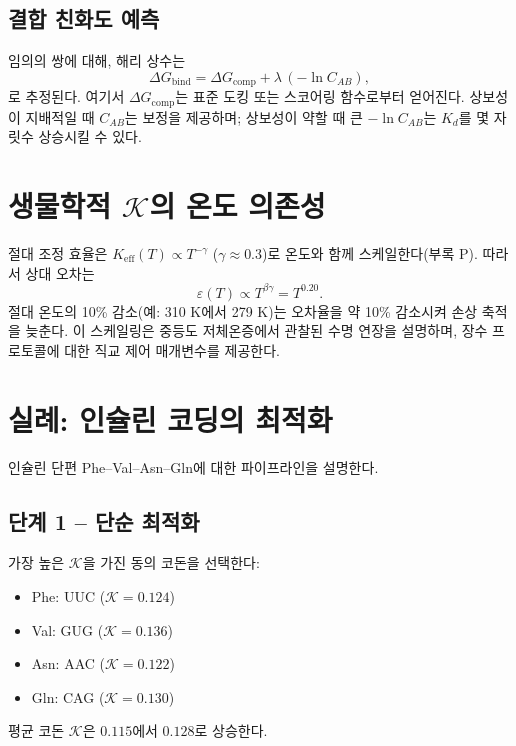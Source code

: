 \documentclass[12pt,a4paper]{article}
\newcommand{\REL}{\mathcal{K}}          %
\newcommand{\ABS}{K_{\mathrm{eff}}}     %
\begin{document}
	\subsection{결합 친화도 예측}
	임의의 쌍에 대해, 해리 상수는
	\[
	\Delta G_{\mathrm{bind}} = \Delta G_{\mathrm{comp}} + \lambda\,(-\ln C_{AB}),
	\label{eq:Kd}
	\]
	로 추정된다. 여기서 \(\Delta G_{\mathrm{comp}}\)는 표준 도킹 또는 스코어링 함수로부터 얻어진다. 상보성이 지배적일 때 \(C_{AB}\)는 보정을 제공하며; 상보성이 약할 때 큰 \(-\ln C_{AB}\)는 \(K_d\)를 몇 자릿수 상승시킬 수 있다.
	
	\section{생물학적 \(\REL\)의 온도 의존성}
	\label{sec:temperature}
	절대 조정 효율은 \(\ABS(T) \propto T^{-\gamma}\) (\(\gamma \approx 0.3\))로 온도와 함께 스케일한다(부록 P). 따라서 상대 오차는
	\[
	\varepsilon(T) \propto T^{\beta\gamma} = T^{0.20}.
	\]
	절대 온도의 10\% 감소(예: 310 K에서 279 K)는 오차율을 약 10\% 감소시켜 손상 축적을 늦춘다. 이 스케일링은 중등도 저체온증에서 관찰된 수명 연장을 설명하며, 장수 프로토콜에 대한 직교 제어 매개변수를 제공한다.
	
	\section{실례: 인슐린 코딩의 최적화}
	\label{sec:insulin}
	인슐린 단편 Phe–Val–Asn–Gln에 대한 파이프라인을 설명한다.
	
	\subsection{단계 1 – 단순 최적화}
	가장 높은 \(\REL\)을 가진 동의 코돈을 선택한다:
	\begin{itemize}
		\item Phe: UUC (\(\REL=0.124\))
		\item Val: GUG (\(\REL=0.136\))
		\item Asn: AAC (\(\REL=0.122\))
		\item Gln: CAG (\(\REL=0.130\))
	\end{itemize}
	평균 코돈 \(\REL\)은 \(0.115\)에서 \(0.128\)로 상승한다.
	
\end{document}
